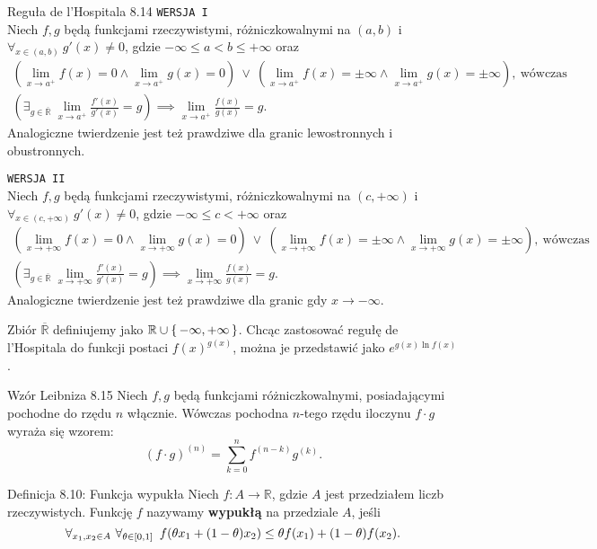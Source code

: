 \documentclass{article}
\newcommand{\hquad}{\mkern9mu}
\newcommand{\R}{\mathbb{R}}
\newcommand*\closure[1]{\overline{#1}}
\begin{document}
\begin{twier}{Reguła de l'Hospitala 8.14}
    \hfill \texttt{WERSJA I}\\ \smallskip
Niech $f,g$ będą funkcjami rzeczywistymi, różniczkowalnymi na $(a,b)$ i $\forall_{x\in(a,b)}\ g'(x)\neq0$, gdzie $-\infty\le a<b\le+\infty$ oraz
\begin{gather*}
   \left( \lim_{x\to a^+}f(x)=0\land \lim_{x\to a^+}g(x)=0\right)\ \lor\ \left( \lim_{x\to a^+}f(x)=\pm\infty\land \lim_{x\to a^+}g(x)=\pm\infty\right),\ \text{wówczas}\\
   \left(\exists_{g\in\closure{\R}}\ \lim_{x\to a^+}{\frac{f'(x)}{g'(x)}}=g\right)\implies\lim_{x\to a^+}{\frac{f(x)}{g(x)}}=g.
\end{gather*}
Analogiczne twierdzenie jest też prawdziwe dla granic lewostronnych i obustronnych.
\bigskip

    \hfill \texttt{WERSJA II}\\ \smallskip
Niech $f,g$ będą funkcjami rzeczywistymi, różniczkowalnymi na $(c,+\infty)$ i $\forall_{x\in(c,+\infty)}\ g'(x)\neq0$, gdzie $-\infty\le c<+\infty$ oraz
\begin{gather*}
    \left( \lim_{x\to +\infty}f(x)=0\land \lim_{x\to +\infty}g(x)=0\right)\ \lor\ \left( \lim_{x\to +\infty}f(x)=\pm\infty\land \lim_{x\to +\infty}g(x)=\pm\infty\right),\ \text{wówczas}\\
    \left(\exists_{g\in\closure{\R}}\ \lim_{x\to +\infty}{\frac{f'(x)}{g'(x)}}=g\right)\implies\lim_{x\to +\infty}{\frac{f(x)}{g(x)}}=g.
\end{gather*}
Analogiczne twierdzenie jest też prawdziwe dla granic gdy $x\to-\infty$.
\end{twier}

Zbiór $\closure{\R}$ definiujemy jako $\R\cup\set{-\infty,+\infty}$. Chcąc zastosować regułę de l'Hospitala do funkcji postaci $f(x)^{g(x)}$, można je przedstawić jako $e^{g(x)\ln{f(x)}}$.

\begin{twier}{Wzór Leibniza 8.15}
    Niech $f,g$ będą funkcjami różniczkowalnymi, posiadającymi pochodne do rzędu $n$ włącznie. Wówczas pochodna $n$-tego rzędu iloczynu $f\cdot g$ wyraża się wzorem:
    \begin{equation*}
        (f\cdot g)^{(n)}=\sum_{k=0}^{n}{f^{(n-k)}g^{(k)}}.
    \end{equation*}
\end{twier}

\begin{defr}{Definicja 8.10: Funkcja wypukła}
    Niech $f:A\to\R$, gdzie $A$ jest przedziałem liczb rzeczywistych. Funkcję $f$ nazywamy \textbf{wypukłą} na przedziale $A$, jeśli 
    \begin{equation*}
        \forall_{x_1,x_2\in A}\ \forall_{\theta\in[0,1]}\hquad f(\theta x_1+(1-\theta)x_2)\le\theta f(x_1)+(1-\theta)f(x_2).
    \end{equation*}
\end{defr}
\end{document}
